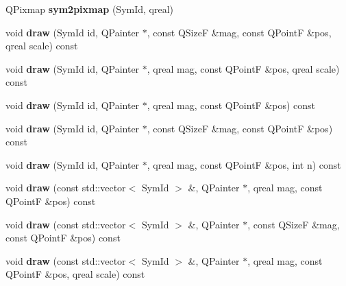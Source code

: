 \begin{DoxyCompactItemize}
\item 
\mbox{\label{class_ms_1_1_score_font_aaaab0bef01f46e51c07fa9ebd1bc999c}} 
Q\+Pixmap {\bfseries sym2pixmap} (Sym\+Id, qreal)
\item 
\mbox{\label{class_ms_1_1_score_font_aa0432f5124dbd00bb69ad15dcac103e5}} 
void {\bfseries draw} (Sym\+Id id, Q\+Painter $\ast$, const Q\+SizeF \&mag, const Q\+PointF \&pos, qreal scale) const
\item 
\mbox{\label{class_ms_1_1_score_font_af79e41fbf48b6941d18fe99e11aec9d7}} 
void {\bfseries draw} (Sym\+Id id, Q\+Painter $\ast$, qreal mag, const Q\+PointF \&pos, qreal scale) const
\item 
\mbox{\label{class_ms_1_1_score_font_a8031340ff0bba8bb566b40957a138fb2}} 
void {\bfseries draw} (Sym\+Id id, Q\+Painter $\ast$, qreal mag, const Q\+PointF \&pos) const
\item 
\mbox{\label{class_ms_1_1_score_font_a116b730b060723cfacf217daffa11659}} 
void {\bfseries draw} (Sym\+Id id, Q\+Painter $\ast$, const Q\+SizeF \&mag, const Q\+PointF \&pos) const
\item 
\mbox{\label{class_ms_1_1_score_font_a11471df7eae02dc938406493bcc79d91}} 
void {\bfseries draw} (Sym\+Id id, Q\+Painter $\ast$, qreal mag, const Q\+PointF \&pos, int n) const
\item 
\mbox{\label{class_ms_1_1_score_font_ac3dba2567b76adcbb5b164b80c567f69}} 
void {\bfseries draw} (const std\+::vector$<$ Sym\+Id $>$ \&, Q\+Painter $\ast$, qreal mag, const Q\+PointF \&pos) const
\item 
\mbox{\label{class_ms_1_1_score_font_a1ceab8b0d90bb1ba7f4d31f9277d0946}} 
void {\bfseries draw} (const std\+::vector$<$ Sym\+Id $>$ \&, Q\+Painter $\ast$, const Q\+SizeF \&mag, const Q\+PointF \&pos) const
\item 
\mbox{\label{class_ms_1_1_score_font_a992ae4e96509a4fe3cbafa78db85e29f}} 
void {\bfseries draw} (const std\+::vector$<$ Sym\+Id $>$ \&, Q\+Painter $\ast$, qreal mag, const Q\+PointF \&pos, qreal scale) const

\end{DoxyCompactItemize}
